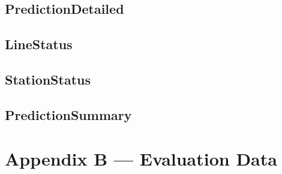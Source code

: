 \documentclass[a4paper,12pt,twoside]{report}
\begin{document}
\section*{PredictionDetailed}



\section*{LineStatus}



\section*{StationStatus}



\section*{PredictionSummary}



\chapter*{Appendix B --- Evaluation Data}


\end{document}
